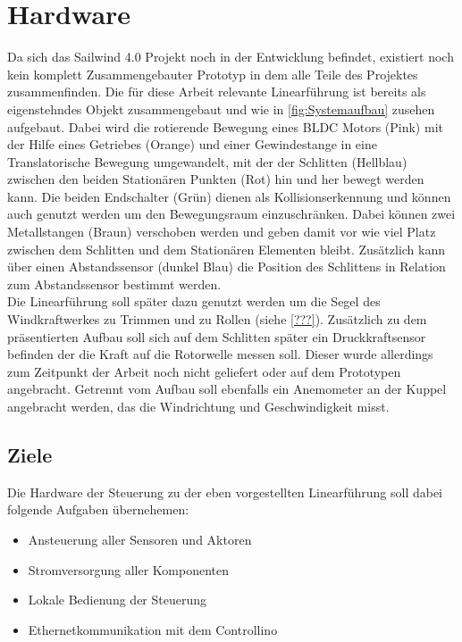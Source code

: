 \section{Hardware}
Da sich das Sailwind 4.0 Projekt noch in der Entwicklung befindet, existiert noch kein komplett Zusammengebauter Prototyp in dem alle Teile des Projektes zusammenfinden. Die für diese Arbeit relevante Linearführung ist bereits als eigenstehndes Objekt zusammengebaut und wie in \autoref{fig:Systemaufbau} zusehen aufgebaut. Dabei wird die rotierende Bewegung eines BLDC Motors (Pink) mit der Hilfe eines Getriebes (Orange) und einer Gewindestange in eine Translatorische Bewegung umgewandelt, mit der der Schlitten (Hellblau) zwischen den beiden Stationären Punkten (Rot) hin und her bewegt werden kann. Die beiden Endschalter (Grün) dienen als Kollisionserkennung und können auch genutzt werden um den Bewegungsraum einzuschränken. Dabei können zwei Metallstangen (Braun) verschoben werden und geben damit vor wie viel Platz zwischen dem Schlitten und dem Stationären Elementen bleibt. Zusätzlich kann über einen Abstandssensor (dunkel Blau) die Position des Schlittens in Relation zum Abstandssensor bestimmt werden.\\

\noindent Die Linearführung soll später dazu genutzt werden um die Segel des Windkraftwerkes zu Trimmen und zu Rollen (siehe \autoref{???}). Zusätzlich zu dem präsentierten Aufbau soll sich auf dem Schlitten später ein Druckkraftsensor befinden der die Kraft auf die Rotorwelle messen soll. Dieser wurde allerdings zum Zeitpunkt der Arbeit noch nicht geliefert oder auf dem Prototypen angebracht. Getrennt vom Aufbau soll ebenfalls ein Anemometer an der Kuppel angebracht werden, das die Windrichtung und Geschwindigkeit misst.

\subsection{Ziele}
Die Hardware der Steuerung zu der eben vorgestellten Linearführung soll dabei folgende Aufgaben übernehemen:
\begin{itemize}
	\item Ansteuerung aller Sensoren und Aktoren
	\item Stromversorgung aller Komponenten
	\item Lokale Bedienung der Steuerung
	\item Ethernetkommunikation mit dem Controllino
\end{itemize}

